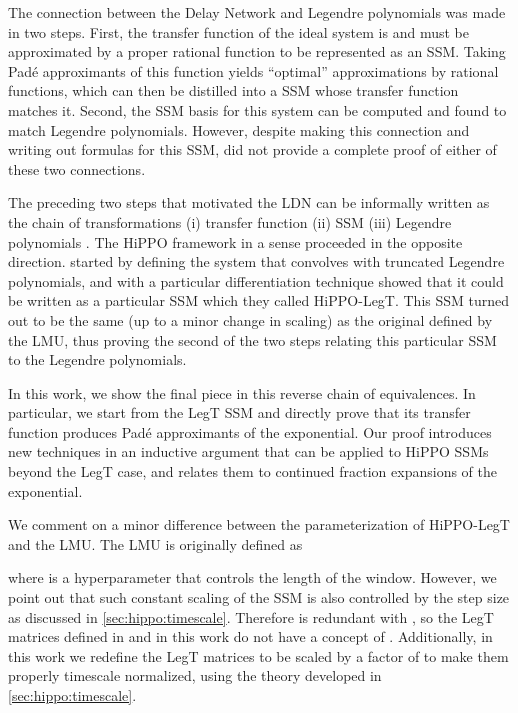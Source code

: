 \documentclass{article}
\begin{document}
The connection between the Delay Network and Legendre polynomials was made in two steps.
First, the transfer function of the ideal system is  and must be approximated by a proper rational function to be represented as an SSM.
Taking Pad\'e approximants of this function yields ``optimal'' approximations by rational functions, which can then be distilled into a SSM  whose transfer function  matches it.
Second, the SSM basis  for this system can be computed and found to match Legendre polynomials.
However, despite making this connection and writing out formulas for this SSM, \citet{voelker2019dynamical} did not provide a complete proof of either of these two connections.

The preceding two steps that motivated the LDN can be informally written as the chain of transformations (i) transfer function   (ii) SSM   (iii) Legendre polynomials .
The HiPPO framework in a sense proceeded in the opposite direction.
\citet{gu2020hippo} started by defining the system that convolves with truncated Legendre polynomials, and with a particular differentiation technique showed that it could be written as a particular SSM which they called HiPPO-LegT.
This SSM turned out to be the same (up to a minor change in scaling) as the original  defined by the LMU, thus proving the second of the two steps relating this particular SSM to the Legendre polynomials.

In this work, we show the final piece in this reverse chain of equivalences.
In particular, we start from the LegT SSM  and directly prove that its transfer function produces Pad\'e approximants of the exponential.
Our proof introduces new techniques in an inductive argument that can be applied to HiPPO SSMs beyond the LegT case,
and relates them to continued fraction expansions of the exponential.


We comment on a minor difference between the parameterization of HiPPO-LegT and the LMU.
The LMU is originally defined as

where  is a hyperparameter that controls the length of the window.
However, we point out that such constant scaling of the SSM is also controlled by the step size  as discussed in \cref{sec:hippo:timescale}.
Therefore  is redundant with , so the LegT matrices defined in \citep{gu2020hippo} and in this work do not have a concept of .
Additionally, in this work we redefine the LegT matrices  to be scaled by a factor of  to make them properly timescale normalized,
using the theory developed in \cref{sec:hippo:timescale}.
\end{document}
